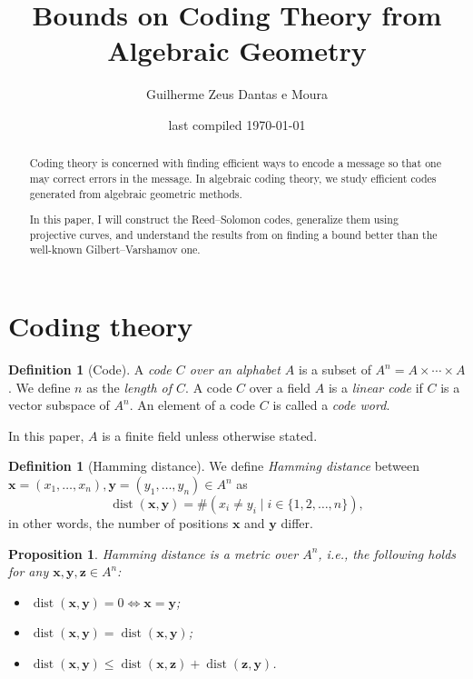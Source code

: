 \documentclass[11pt]{amsart}
\title[Codes from Algebraic Geometry]{Bounds on Coding Theory from Algebraic Geometry}
\author{Guilherme Zeus Dantas e Moura}
\date{last compiled \today} %
\theoremstyle{theorem}
\newtheorem{prop}[thm]{Proposition}
\theoremstyle{definition}
\newtheorem{defn}[thm]{Definition}
\theoremstyle{example}
\theoremstyle{remark}
\numberwithin{equation}{section}
\DeclareMathOperator{\dist}{dist}
\begin{document}
\maketitle
\begin{abstract} %
    Coding theory is concerned with finding efficient ways to encode a message so that one may correct errors in the message. In algebraic coding theory, we study efficient codes generated from algebraic geometric methods.
    
    In this paper, I will construct the Reed--Solomon codes, generalize them using projective curves, and understand the results from \cite{TVZ82} on finding a bound better than the well-known Gilbert--Varshamov one.
\end{abstract} 

\section{Coding theory} \label{s:codingtheory}

\begin{defn}[Code]
    A \emph{code $C$ over an alphabet $A$} is a subset of $A^n = A \times \cdots \times A$.
    We define $n$ as the \emph{length of $C$}.
    A code $C$ over a field $A$ is a \emph{linear code} if $C$ is a vector subspace of $A^n$. An element of a code $C$ is called a \emph{code word}.
\end{defn}

In this paper, $A$ is a finite field unless otherwise stated.

\begin{defn}[Hamming distance]
    We define \emph{Hamming distance} between $\mathbf{x} = (x_1, \dots, x_n), \mathbf{y} = (y_1, \dots, y_n) \in A^n$ as
    \begin{equation}
		\dist(\mathbf{x}, \mathbf{y}) = \#\left( x_i \neq y_i \mid i \in \{1, 2, \dots, n\} \right),
	\end{equation}
    in other words, the number of positions $\mathbf{x}$ and $\mathbf{y}$ differ.
\end{defn}

\begin{prop}
    Hamming distance is a metric over $A^n$, i.e., the following holds for any $\mathbf{x}, \mathbf{y}, \mathbf{z} \in A^n$:
    \begin{itemize}[noitemsep]
        \item $\dist(\mathbf{x}, \mathbf{y}) = 0 \iff \mathbf{x} = \mathbf{y}$;
        \item $\dist(\mathbf{x}, \mathbf{y}) = \dist(\mathbf{x}, \mathbf{y})$;
        \item $\dist(\mathbf{x}, \mathbf{y}) \le \dist(\mathbf{x}, \mathbf{z}) + \dist(\mathbf{z}, \mathbf{y})$.
    \end{itemize}
\end{prop}
\end{document}
